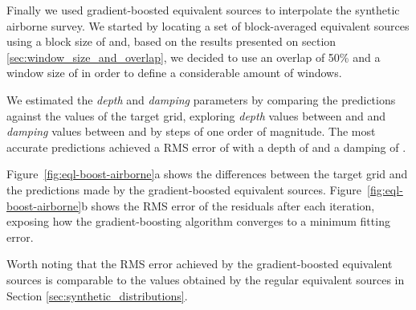 Finally we used gradient-boosted equivalent sources to interpolate the
synthetic airborne survey. We started by locating a set of block-averaged
equivalent sources using a block size of \EqlBoostAirborneSpacing{} and, based
on the results presented on section \ref{sec:window_size_and_overlap}, we
decided to use an overlap of 50\% and a window size of
\EqlBoostAirborneWindowSize{} in order to define a considerable amount of
windows.

We estimated the \emph{depth} and \emph{damping} parameters by comparing the
predictions against the values of the target grid, exploring \emph{depth}
values between \EqlBoostAirborneMinDepth{} and \EqlBoostAirborneMaxDepth{} and
\emph{damping} values between \EqlBoostAirborneMinDamping{} and
\EqlBoostAirborneMaxDamping{} by steps of one order of magnitude.
The most accurate predictions achieved a RMS error of
\EqlBoostAirborneRmsScore{} with a depth of \EqlBoostAirborneDepth{} and
a damping of \EqlBoostAirborneDamping{}.

Figure~\ref{fig:eql-boost-airborne}a shows the differences between the target
grid and the predictions made by the gradient-boosted equivalent sources.
Figure~\ref{fig:eql-boost-airborne}b shows the RMS error of the
residuals after each iteration, exposing how the gradient-boosting algorithm
converges to a minimum fitting error.

Worth noting that the RMS error achieved by the gradient-boosted equivalent
sources is comparable to the values obtained by the regular equivalent sources
in Section \ref{sec:synthetic_distributions}.

